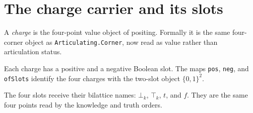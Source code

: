 \section{The charge carrier and its slots}

\begin{proposition}[Charge]\label{thm:charge}\leanok{}
A \emph{charge} is the four-point value object of positing. Formally it is
the same four-corner object as \texttt{Articulating.Corner}, now read as
value rather than articulation status.
\end{proposition}

\begin{proposition}\label{thm:charge-slots}\leanok{}
Each charge has a positive and a negative Boolean slot. The maps
\texttt{pos}, \texttt{neg}, and \texttt{ofSlots} identify the four charges
with the two-slot object $\{0,1\}^2$.
\end{proposition}

\begin{proposition}\label{thm:four-charges}\leanok{}
The four slots receive their bilattice names:
$\bot_k$, $\top_k$, $t$, and $f$. They are the same four points read by the
knowledge and truth orders.
\end{proposition}
